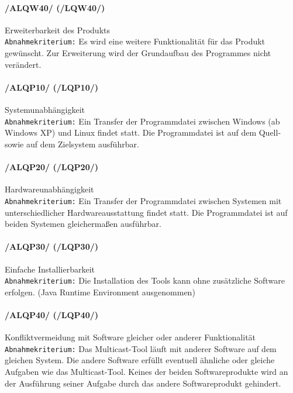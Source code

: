 \paragraph{/ALQW40/ (/LQW40/)} Erweiterbarkeit des Produkts\\
\texttt{Abnahmekriterium:} Es wird eine weitere Funktionalität für das Produkt
gewünscht. Zur Erweiterung wird der Grundaufbau des Programmes nicht
verändert.\\

\paragraph{/ALQP10/ (/LQP10/)} Systemunabhängigkeit\\
\texttt{Abnahmekriterium:} Ein Transfer der Programmdatei
zwischen Windows (ab Windows XP) und Linux findet statt. Die
Programmdatei ist auf dem Quell- sowie auf dem Zielsystem
ausführbar.\\

\paragraph{/ALQP20/ (/LQP20/)} Hardwareunabhängigkeit\\
\texttt{Abnahmekriterium:} Ein Transfer der Programmdatei
zwischen Systemen mit unterschiedlicher Hardwareausstattung
findet statt. Die Programmdatei ist auf beiden Systemen
gleichermaßen ausführbar.\\

\paragraph{/ALQP30/ (/LQP30/)} Einfache Installierbarkeit\\ 
\texttt{Abnahmekriterium:} Die Installation des Tools kann ohne
zusätzliche Software erfolgen. (Java Runtime Environment ausgenommen)\\

\paragraph{/ALQP40/ (/LQP40/)} Konfliktvermeidung mit Software gleicher oder
anderer Funktionalität\\
\texttt{Abnahmekriterium:} Das Multicast-Tool läuft mit anderer
Software auf dem gleichen System. Die andere Software erfüllt
eventuell ähnliche oder gleiche Aufgaben wie das Multicast-Tool.
Keines der beiden Softwareprodukte wird an der Ausführung seiner
Aufgabe durch das andere Softwareprodukt gehindert.\\
